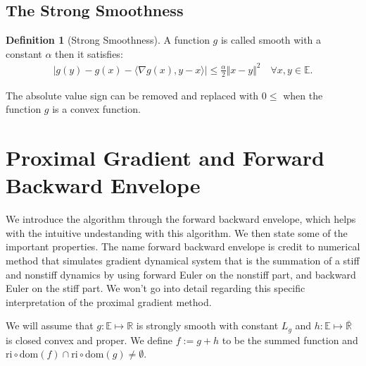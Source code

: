 \documentclass[]{article}
\theoremstyle{definition}
\newtheorem{definition}{Definition}
\begin{document}
    \subsection{The Strong Smoothness}
        \begin{definition}[Strong Smoothness]\label{def:strong_smoothness}
            A function $g$ is called smooth with a constant $\alpha$ then it satisfies: 
            \begin{align}
                |g(y) - g(x) - 
                \langle \nabla g(x), y - x
                \rangle| \le \frac{\alpha}{2}\Vert x - y\Vert^2
                \quad \forall x, y\in \mathbb E. 
            \end{align}    
        \end{definition}
        The absolute value sign can be removed and replaced with $0\le$ when the function $g$ is a convex function.
        

\section{Proximal Gradient and Forward Backward Envelope}
    We introduce the algorithm through the forward backward envelope, which helps with the intuitive undestanding with this algorithm. We then state some of the important properties. The name forward backward envelope is credit to numerical method that simulates gradient dynamical system that is the summation of a stiff and nonstiff dynamics by using forward Euler on the nonstiff part, and backward Euler on the stiff part. We won't go into detail regarding this specific interpretation of the proximal gradient method. 
    \begin{assumption}\label{assumption:1}
        We will assume that $g:\mathbb E\mapsto \mathbb R$ is strongly smooth with constant $L_g$ and $h:\mathbb E \mapsto \bar{\mathbb R}$ is closed convex and proper. We define $f := g + h$ to be the summed function and $\text{ri}\circ \text{dom}(f) \cap \text{ri}\circ \text{dom}(g) \neq \emptyset$. 
    \end{assumption}
    
\end{document}
